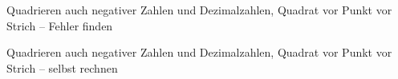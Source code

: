 \begin{aufgabe}{Quadrieren auch negativer Zahlen und Dezimalzahlen, Quadrat vor Punkt vor Strich – Fehler finden}
\end{aufgabe}

\begin{aufgabe}{Quadrieren auch negativer Zahlen und Dezimalzahlen, Quadrat vor Punkt vor Strich – selbst rechnen}
\end{aufgabe}
